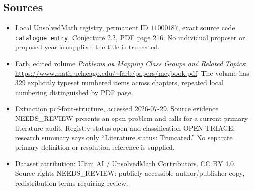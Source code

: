 \documentclass[11pt]{article}
\begin{document}
\subsection{Sources}
\begin{itemize}
\item Local UnsolvedMath registry, permanent ID \(11000187\), exact source code \texttt{catalogue entry}, Conjecture 2.2, PDF page 216. No individual proposer or proposed year is supplied; the title is truncated.
\item Farb, edited volume \emph{Problems on Mapping Class Groups and Related Topics}: \url{https://www.math.uchicago.edu/~farb/papers/mcgbook.pdf}. The volume has 329 explicitly typeset numbered items across chapters, repeated local numbering distinguished by PDF page.
\item Extraction pdf-font-structure, accessed 2026-07-29. Source evidence NEEDS\_REVIEW presents an open problem and calls for a current primary-literature audit. Registry status open and classification OPEN-TRIAGE; research summary says only ``Literature status: Truncated.'' No separate primary definition or resolution reference is supplied.
\item Dataset attribution: Ulam AI / UnsolvedMath Contributors, CC BY 4.0. Source rights NEEDS\_REVIEW: publicly accessible author/publisher copy, redistribution terms requiring review.
\end{itemize}
\end{document}
